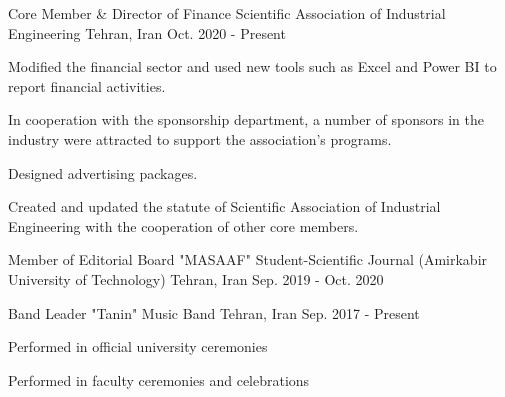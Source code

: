 

\begin{cventries}

  \cventry
    {Core Member \& Director of Finance} %
    {Scientific Association of Industrial Engineering} %
    {Tehran, Iran} %
    {Oct. 2020 - Present} %
    {
      \begin{cvitems} %
        \item {Modified the financial sector and used new tools such as Excel and Power BI to report financial activities.}
        \item {In cooperation with the sponsorship department, a number of sponsors in the industry were attracted to support the association's programs.}
        \item {Designed advertising packages.}
        \item {Created and updated the statute of Scientific Association of Industrial Engineering with the cooperation of other core members.}
      \end{cvitems}
    }

  \cventry
    {Member of Editorial Board} %
    {"MASAAF" Student-Scientific Journal (Amirkabir University of Technology)} %
    {Tehran, Iran} %
    {Sep. 2019 - Oct. 2020} %
    {
    }

  \cventry
    {Band Leader} %
    {"Tanin" Music Band} %
    {Tehran, Iran} %
    {Sep. 2017 - Present} %
    {
      \begin{cvitems} %
        \item {Performed in official university ceremonies}
        \item {Performed in faculty ceremonies and celebrations}
      \end{cvitems}
    }
    
\end{cventries}
